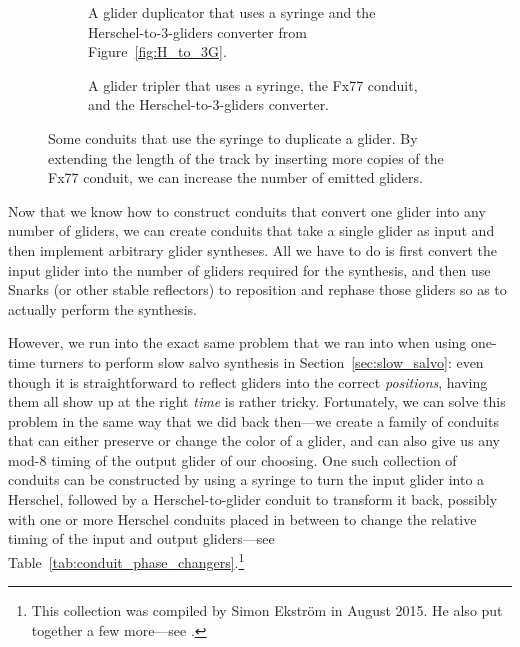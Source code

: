 \begin{figure}[!htb]
	\centering
	\begin{subfigure}{.38\textwidth}
		\centering
		\caption{A glider duplicator that uses a syringe and the Herschel-to-$3$-gliders converter from Figure~\ref{fig:H_to_3G}.}\label{fig:glider_duplicator}
	\end{subfigure} \hfill %
	\begin{subfigure}{.58\textwidth}
		\centering
		\caption{A glider tripler that uses a syringe, the Fx77 conduit, and the Herschel-to-$3$-gliders converter.}
		\label{fig:glider_tripler}
	\end{subfigure}
	\caption{Some conduits that use the syringe to duplicate a glider. By extending the length of the track by inserting more copies of the Fx77 conduit, we can increase the number of emitted gliders.}\label{fig:glider_multipliers}
\end{figure}

Now that we know how to construct conduits that convert one glider into any number of gliders, we can create conduits that take a single glider as input and then implement arbitrary glider syntheses. All we have to do is first convert the input glider into the number of gliders required for the synthesis, and then use Snarks (or other stable reflectors) to reposition and rephase those gliders so as to actually perform the synthesis.

However, we run into the exact same problem that we ran into when using one-time turners to perform slow salvo synthesis in Section~\ref{sec:slow_salvo}: even though it is straightforward to reflect gliders into the correct \emph{positions}, having them all show up at the right \emph{time} is rather tricky. Fortunately, we can solve this problem in the same way that we did back then---we create a family of conduits that can either preserve or change the color of a glider, and can also give us any mod-$8$ timing of the output glider of our choosing. One such collection of conduits can be constructed by using a syringe to turn the input glider into a Herschel, followed by a Herschel-to-glider conduit to transform it back, possibly with one or more Herschel conduits placed in between to change the relative timing of the input and output gliders---see Table~\ref{tab:conduit_phase_changers}.\footnote{This collection was compiled by Simon Ekstr\"{o}m in August 2015. He also put together a few more---see .}


